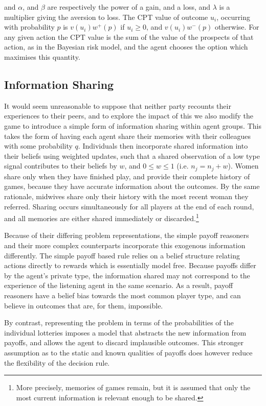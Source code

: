 and $\alpha$, and $\beta$ are respectively the power of a gain,
and a loss, and \(\lambda\) is a multiplier giving the aversion to loss. The \ac{CPT} value of outcome $u_{i}$, occurring with probability \(p\) is $v(u_{i})w^{+}(p)$
if $u_{i}\geq0$, and $v(u_{i})w^{-}(p)$ otherwise. For any given action the \ac{CPT}
value is the sum of the value of the prospects of that action, as
in the Bayesian risk model, and the agent chooses the option which maximises this quantity.

\subsection{Information Sharing}
\label{sub:info_sharing}

It would seem unreasonable to suppose that neither party recounts their experiences to their peers, and to explore the impact of this we also modify the game to introduce a simple form of information sharing within agent groups. This takes the form of having each agent share their memories with their colleagues with some probability \(q\). Individuals then incorporate shared information into their beliefs using weighted updates, such that a shared observation of a low type signal contributes to their beliefs by \(w\), and \(0\leq w\leq 1\) (i.e. \(n_{j} = n_{j} + w\)).
Women share only when they have finished play, and provide their complete history of games, because they have accurate information about the outcomes. By the same rationale, midwives share only their history with the most recent woman they referred. Sharing occurs simultaneously for all players at the end of each round, and all memories are either shared immediately or discarded.\footnote{More precisely, memories of games remain, but it is assumed that only the most current information is relevant enough to be shared.}

Because of their differing problem representations, the simple payoff reasoners and their more complex counterparts incorporate this exogenous information differently. The simple payoff based rule relies on a belief structure relating actions directly to rewards which is essentially model free. Because payoffs differ by the agent's private type, the information shared may not correspond to the experience of the listening agent in the same scenario. As a result, payoff reasoners have a belief bias towards the most common player type, and can believe in outcomes that are, for them, impossible.

By contrast, representing the problem in terms of the probabilities of the individual lotteries imposes a model that abstracts the new information from payoffs, and allows the agent to discard implausible outcomes. This stronger assumption as to the static and known qualities of payoffs does however reduce the flexibility of the decision rule.
